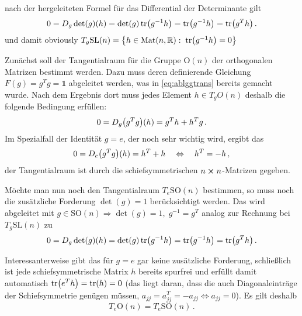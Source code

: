 \documentclass[../H_Analysis_main.tex]{subfiles}
\begin{document}
\begin{bsp}
nach der hergeleiteten Formel für das Differential der Determinante gilt
\begin{equation}
0 = D_g \det(g) (h) = \det(g) \tr(g^{-1} h) = \tr(g^{-1} h) = \tr(g^T h) \, .
\end{equation}
und damit obviously $T_g \text{SL}(n) = \qty{h \in \text{Mat}(n, \mathbb{R}): \; \tr(g^{-1} h) = 0}$%
\end{bsp}

\begin{bsp}[Tangentialraum zu O$(n)$%
]\label{bsp:tangraumso}
Zunächst soll der Tangentialraum für die Gruppe O$(n)$ der orthogonalen Matrizen bestimmt werden. Dazu muss deren definierende Gleichung $F(g) = g^T g = \mathds{1}$ abgeleitet werden, was in \eqref{eq:ablggtrans} bereits gemacht wurde. Nach dem Ergebnis dort muss jedes Element $h \in T_g O(n)$ deshalb die folgende Bedingung erfüllen:
\begin{align}
0 = D_g \qty(g^T g)(h) = g^T h + h^T g \, .
\end{align}
Im Spezialfall der Identität $g = e$, der noch sehr wichtig wird, ergibt das
\begin{align}
0 = D_e \qty(g^T g)(h) = h^T + h \quad \Leftrightarrow \quad h^T = - h \, ,
\end{align}
der Tangentialraum ist durch die schiefsymmetrischen $n \cross n$-Matrizen gegeben.


Möchte man nun noch den Tangentialraum $T_e \text{SO}(n)$ bestimmen, so muss noch die zusätzliche Forderung $\det(g) = 1$ berücksichtigt werden. Das wird abgeleitet mit $g \in \text{SO}(n) \Rightarrow \det(g) = 1, \; g^{-1} = g^T$ analog zur Rechnung bei $T_g \text{SL}(n)$ zu
\begin{equation*}
0 = D_g \det(g) (h) = \det(g) \tr(g^{-1} h) = \tr(g^{-1} h) = \tr(g^T h) \, .
\end{equation*}

Interessanterweise gibt das für $g = e$ gar keine zusätzliche Forderung, schließlich ist jede schiefsymmetrische Matrix $h$ bereits spurfrei und erfüllt damit automatisch $\tr(e^T h) = \tr(h) = 0$ (das liegt daran, dass die auch Diagonaleinträge der Schiefsymmetrie genügen müssen, $a_{jj} = a^T_{jj} = - a_{jj} \Leftrightarrow a_{jj} = 0$). Es gilt deshalb
\begin{equation}
T_e \text{O}(n) = T_e \text{SO}(n) \, .
\end{equation}
\end{bsp}
\end{document}

